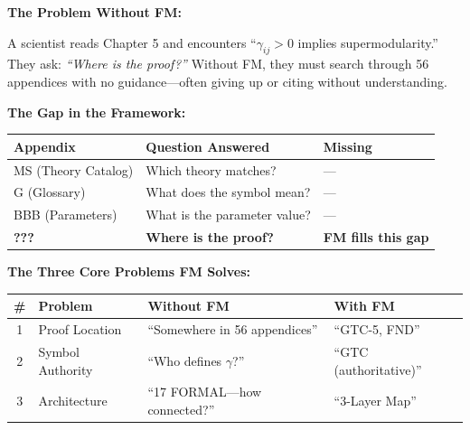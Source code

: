 \begin{tcolorbox}[colback=orange!5!white, colframe=orange!75!black,
    title=\textbf{Motivation: Why Do We Need This Appendix?}]

\textbf{The Problem Without FM:}

A scientist reads Chapter 5 and encounters ``$\gamma_{ij} > 0$ implies supermodularity.''
They ask: \textit{``Where is the proof?''} Without FM, they must search through 56 appendices
with no guidance---often giving up or citing without understanding.

\vspace{0.5em}
\textbf{The Gap in the Framework:}

\begin{center}
\begin{tabular}{|l|l|l|}
\hline
\textbf{Appendix} & \textbf{Question Answered} & \textbf{Missing} \\
\hline
\hline
MS (Theory Catalog) & Which theory matches? & --- \\
G (Glossary) & What does the symbol mean? & --- \\
BBB (Parameters) & What is the parameter value? & --- \\
\textbf{???} & \textbf{Where is the proof?} & \textbf{FM fills this gap} \\
\hline
\end{tabular}
\end{center}

\vspace{0.5em}
\textbf{The Three Core Problems FM Solves:}

\begin{center}
\begin{tabular}{|c|l|l|l|}
\hline
\textbf{\#} & \textbf{Problem} & \textbf{Without FM} & \textbf{With FM} \\
\hline
\hline
1 & Proof Location & ``Somewhere in 56 appendices'' & ``GTC-5, FND'' \\
2 & Symbol Authority & ``Who defines $\gamma$?'' & ``GTC (authoritative)'' \\
3 & Architecture & ``17 FORMAL---how connected?'' & ``3-Layer Map'' \\
\hline
\end{tabular}
\end{center}


\end{tcolorbox}
